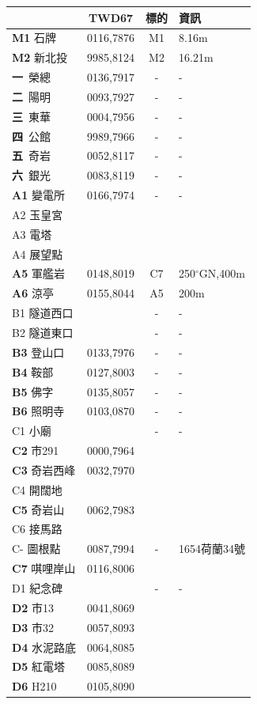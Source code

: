 \documentclass{article}
\begin{document}
\begin{CJK*}{UTF8}{bkai}
\begin{multicols}{2}
\begin{tabular}{|l|c|c|l|}
	\hline
	&TWD67&標的&資訊\\  
	\hline
	\textbf{M1} 石牌&0116,7876&M1&8.16m\\
	\textbf{M2} 新北投&9985,8124&M2&16.21m\\
	\hline
	\textbf{一}\ 榮總&0136,7917&-&-\\
	\textbf{二}\ 陽明&0093,7927&-&-\\
	\textbf{三}\ 東華&0004,7956&-&-\\
	\textbf{四}\ 公館&9989,7966&-&-\\
	\textbf{五}\ 奇岩&0052,8117&-&-\\
	\textbf{六}\ 銀光&0083,8119&-&-\\
	\hline
	\textbf{A1} 變電所&0166,7974&-&-\\
	A2 玉皇宮& & &\\
	A3 電塔& & &\\
	A4 展望點& & &\\
	\textbf{A5} 軍艦岩&0148,8019& C7 &250$^{\circ}$GN,400m\\
	\textbf{A6} 涼亭&0155,8044&A5&200m\\
	\hline
	B1 隧道西口& &-&-\\
	B2 隧道東口& &-&-\\
	\textbf{B3} 登山口&0133,7976&-&-\\
	\textbf{B4} 鞍部&0127,8003&-&-\\
	\textbf{B5} 佛字&0135,8057&-&-\\
	\textbf{B6} 照明寺&0103,0870&-&-\\
	\hline
	C1 小廟& &-&-\\
	\textbf{C2} 市291&0000,7964& &\\
	\textbf{C3} 奇岩西峰&0032,7970& &\\
	C4 開闊地& & &\\
	\textbf{C5} 奇岩山&0062,7983& &\\
	C6 接馬路& & &\\
	C- 圖根點&0087,7994&-&1654荷蘭34號\\
	\textbf{C7} 唭哩岸山&0116,8006& &\\
	\hline
	D1 紀念碑& &-&-\\
	\textbf{D2} 市13&0041,8069& &\\
	\textbf{D3} 市32&0057,8093& &\\
	\textbf{D4} 水泥路底&0064,8085& &\\
	\textbf{D5} 紅電塔&0085,8089& &\\
	\textbf{D6} H210&0105,8090& &\\

\end{tabular}
\end{multicols}
\end{CJK*}
\end{document}
